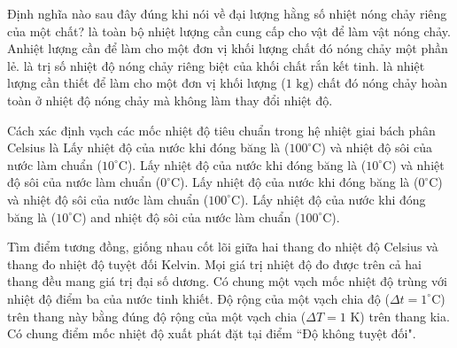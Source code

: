 \begin{ex}%
	Định nghĩa nào sau đây đúng khi nói về đại lượng hằng số nhiệt nóng chảy riêng của một chất?
	\choice
	{là toàn bộ nhiệt lượng cần cung cấp cho vật để làm vật nóng chảy.}
	{Anhiệt lượng cần để làm cho một đơn vị khối lượng chất đó nóng chảy một phần lẻ.}
	{là trị số nhiệt độ nóng chảy riêng biệt của khối chất rắn kết tinh.}
	{\True là nhiệt lượng cần thiết để làm cho một đơn vị khối lượng ($1\text{ kg}$) chất đó nóng chảy hoàn toàn ở nhiệt độ nóng chảy mà không làm thay đổi nhiệt độ.}
\end{ex}

\begin{ex}%
	Cách xác định vạch các mốc nhiệt độ tiêu chuẩn trong hệ nhiệt giai bách phân Celsius là
	\choice
	{Lấy nhiệt độ của nước khi đóng băng là ($100^\circ\text{C}$) và nhiệt độ sôi của nước làm chuẩn ($10^\circ\text{C}$).}
	{Lấy nhiệt độ của nước khi đóng băng là ($10^\circ\text{C}$) và nhiệt độ sôi của nước làm chuẩn ($0^\circ\text{C}$).}
	{\True Lấy nhiệt độ của nước khi đóng băng là ($0^\circ\text{C}$) và nhiệt độ sôi của nước làm chuẩn ($100^\circ\text{C}$).}
	{Lấy nhiệt độ của nước khi đóng băng là ($10^\circ\text{C}$) and nhiệt độ sôi của nước làm chuẩn ($100^\circ\text{C}$).}
\end{ex}

\begin{ex}%
	Tìm điểm tương đồng, giống nhau cốt lõi giữa hai thang đo nhiệt độ Celsius và thang đo nhiệt độ tuyệt đối Kelvin.
	\choice
	{Mọi giá trị nhiệt độ đo được trên cả hai thang đều mang giá trị đại số dương.}
	{Có chung một vạch mốc nhiệt độ trùng với nhiệt độ điểm ba của nước tinh khiết.}
	{\True Độ rộng của một vạch chia độ ($\Delta t = 1^\circ\text{C}$) trên thang này bằng đúng độ rộng của một vạch chia ($\Delta T = 1\text{ K}$) trên thang kia.}
	{Có chung điểm mốc nhiệt độ xuất phát đặt tại điểm “Độ không tuyệt đối".}
\end{ex}

